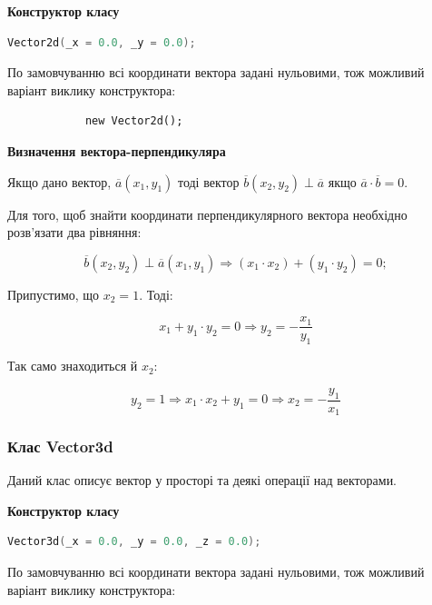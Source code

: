 \documentclass[simple,a4paper,14pt,ukrainian,utf8]{eskdtext}
\begin{document}
        	\textbf{Конструктор класу}

            \begin{lstlisting}[language=C++]
            Vector2d(_x = 0.0, _y = 0.0);
            \end{lstlisting}

            По замовчуванню всі координати вектора задані нульовими, тож можливий варіант виклику конструктора:

            \begin{lstlisting}
            new Vector2d(); 
            \end{lstlisting}     	
     	
	     	\textbf{Визначення вектора-перпендикуляра}
	     	
	     	Якщо дано вектор, $\overline{a} (x_1, y_1)$ тоді вектор $\overline{b} (x_2, y_2) \perp \overline{a}$ якщо $\overline{a} \cdot \overline{b} = 0$.
	     	
	     	Для того, щоб знайти координати перпендикулярного вектора необхідно розв’язати два рівняння:
	     	
	     	$$
	     		\overline{b}(x_2, y_2) \perp \overline{a}(x_1, y_1) \Rightarrow (x_1 \cdot x_2) + (y_1 \cdot y_2) = 0;
	     	$$
	     	
			Припустимо, що $x_2 = 1$. Тоді:
	     	
	     	$$
	     		x_1 + y_1 \cdot y_2 = 0 \Rightarrow y_2 = -\frac{x_1}{y_1}
	     	$$
	     	
	     	Так само знаходиться й $x_2$:
	     	
	     	$$
	     		y_2 = 1 \Rightarrow x_1 \cdot x_2 + y_1 = 0 \Rightarrow x_2 = -\frac{y_1}{x_1}
	     	$$
     	
    	\subsubsection{Клас Vector3d}

            Даний клас описує вектор у просторі та деякі операції над векторами.

            \textbf{Конструктор класу}

            \begin{lstlisting}[language=C++]
            Vector3d(_x = 0.0, _y = 0.0, _z = 0.0);
            \end{lstlisting}

            По замовчуванню всі координати вектора задані нульовими, тож можливий варіант виклику конструктора:
\end{document}
